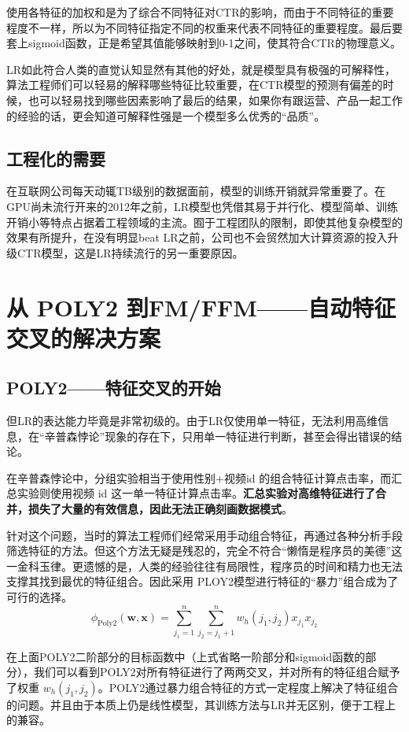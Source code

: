 \documentclass[12pt]{article}
\begin{document}
使用各特征的加权和是为了综合不同特征对CTR的影响，而由于不同特征的重要程度不一样，所以为不同特征指定不同的权重来代表不同特征的重要程度。最后要套上sigmoid函数，正是希望其值能够映射到0-1之间，使其符合CTR的物理意义。

LR如此符合人类的直觉认知显然有其他的好处，就是模型具有极强的可解释性，算法工程师们可以轻易的解释哪些特征比较重要，在CTR模型的预测有偏差的时候，也可以轻易找到哪些因素影响了最后的结果，如果你有跟运营、产品一起工作的经验的话，更会知道可解释性强是一个模型多么优秀的“品质”。

\subsection{工程化的需要}
在互联网公司每天动辄TB级别的数据面前，模型的训练开销就异常重要了。在GPU尚未流行开来的2012年之前，LR模型也凭借其易于并行化、模型简单、训练开销小等特点占据着工程领域的主流。囿于工程团队的限制，即使其他复杂模型的效果有所提升，在没有明显beat LR之前，公司也不会贸然加大计算资源的投入升级CTR模型，这是LR持续流行的另一重要原因。

\section{从 POLY2 到FM/FFM——自动特征交叉的解决方案}
\subsection{POLY2——特征交叉的开始}
但LR的表达能力毕竟是非常初级的。由于LR仅使用单一特征，无法利用高维信息，在“辛普森悖论”现象的存在下，只用单一特征进行判断，甚至会得出错误的结论。

在辛普森悖论中，分组实验相当于使用性别+视频id 的组合特征计算点击率，而汇总实验则使用视频 id 这一单一特征计算点击率。\textbf{汇总实验对高维特征进行了合并，损失了大量的有效信息，因此无法正确刻画数据模式}。

针对这个问题，当时的算法工程师们经常采用手动组合特征，再通过各种分析手段筛选特征的方法。但这个方法无疑是残忍的，完全不符合“懒惰是程序员的美德”这一金科玉律。更遗憾的是，人类的经验往往有局限性，程序员的时间和精力也无法支撑其找到最优的特征组合。因此采用 PLOY2模型进行特征的“暴力”组合成为了可行的选择。
$$
\phi_{\text{Poly2}}(\mathbf{w}, \mathbf{x}) = \sum_{j_1=1}^n\sum_{j_2 = j_1 + 1}^n w_h(j_1, j_2)x_{j_1}x_{j_2}
$$

在上面POLY2二阶部分的目标函数中（上式省略一阶部分和sigmoid函数的部分），我们可以看到POLY2对所有特征进行了两两交叉，并对所有的特征组合赋予了权重 $w_h(j_1, j_2)$。POLY2通过暴力组合特征的方式一定程度上解决了特征组合的问题。并且由于本质上仍是线性模型，其训练方法与LR并无区别，便于工程上的兼容。
\end{document}
